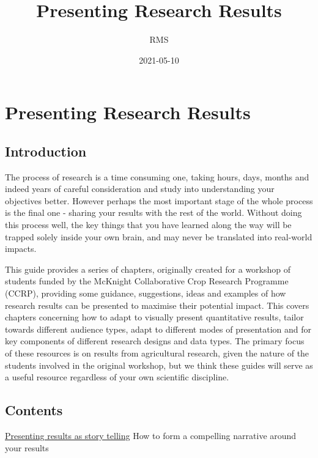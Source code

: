 \documentclass[
  titlepage]{book}
\title{Presenting Research Results}
\author{RMS}
\date{2021-05-10}
\begin{document}
\maketitle

{
\setcounter{tocdepth}{1}
\tableofcontents
}
\hypertarget{presenting-research-results}{%
\chapter{Presenting Research Results}\label{presenting-research-results}}

\hypertarget{introduction}{%
\section{Introduction}\label{introduction}}

The process of research is a time consuming one, taking hours, days, months and indeed years of careful consideration and study into understanding your objectives better. However perhaps the most important stage of the whole process is the final one - sharing your results with the rest of the world. Without doing this process well, the key things that you have learned along the way will be trapped solely inside your own brain, and may never be translated into real-world impacts.

This guide provides a series of chapters, originally created for a workshop of students funded by the McKnight Collaborative Crop Research Programme (CCRP), providing some guidance, suggestions, ideas and examples of how research results can be presented to maximise their potential impact. This covers chapters concerning how to adapt to visually present quantitative results, tailor towards different audience types, adapt to different modes of presentation and for key components of different research designs and data types. The primary focus of these resources is on results from agricultural research, given the nature of the students involved in the original workshop, but we think these guides will serve as a useful resource regardless of your own scientific discipline.

\hypertarget{contents}{%
\section{Contents}\label{contents}}

\protect\hyperlink{story}{Presenting results as story telling}
How to form a compelling narrative around your results
\end{document}
